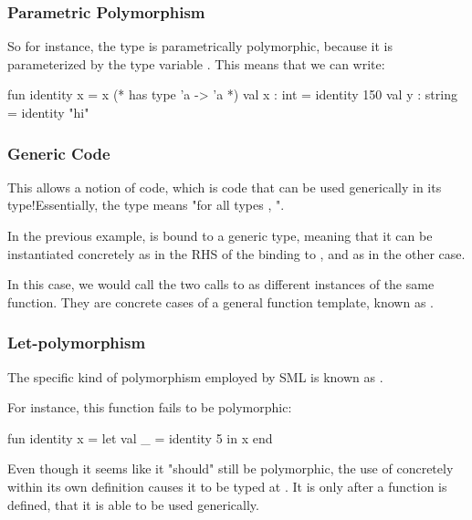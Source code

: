 \documentclass[aspectratio=169]{beamer}
\begin{document}
\begin{frame}[fragile]
  \frametitle{Parametric Polymorphism}


  So for instance, the type  is parametrically polymorphic,
  because it is parameterized by the type variable . This means
  that we can write:

  \begin{codeblock}
    fun identity x = x (* has type 'a -> 'a *)
    val x : int = identity 150
    val y : string = identity "hi"
  \end{codeblock}
\end{frame}

\begin{frame}[fragile]
  \frametitle{Generic Code}

  This allows a notion of  code, which is code that can be 
  used generically in its type!\footnotemark Essentially, the type 
   means "for all types , ".

  In the previous example,  is bound to a generic type, meaning
  that it can be instantiated concretely as  in the RHS of 
  the binding to , and as  in the other case. 

  In this case, we would call the two calls to  as different
  instances of the same function. They are concrete cases of a general 
  function template, known as .
  
\end{frame}

\begin{frame}[fragile]
  \frametitle{Let-polymorphism}

  The specific kind of polymorphism employed by SML is known as .\footnotemark


  For instance, this function fails to be polymorphic: 
  \begin{codeblock}
    fun identity x =
      let 
        val _ = identity 5
      in
        x
      end
  \end{codeblock}

  Even though it seems like it "should" still be polymorphic, the use of 
  concretely within its own definition causes it to be typed at . It
  is only after a function is defined, that it is able to be used generically. 

\end{frame}
\end{document}
